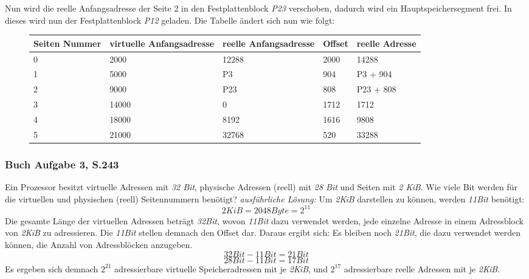 \documentclass[12pt,a4paper]{article}
\begin{document}
\newline
\newline
Nun wird die reelle Anfangsadresse der Seite 2 in den Festplattenblock \textit{P23} verschoben, dadurch wird ein Hauptspeichersegment frei. In dieses wird nun der Festplattenblock \textit{P12} geladen. Die Tabelle ändert sich nun wie folgt:
\begin{figure}[h]
	\begin{tabularx}{17cm}{| X | X | X | X | X |}
		\hline 
		\small{Seiten Nummer} & \small{virtuelle Anfangsadresse} & \small{reelle Anfangsadresse} & \small{Offset} & 			\small{reelle Adresse} \\
		\hline
		0 & 2000 & 12288 & 2000 & 14288 \\
		\hline
		1 & 5000 & P3 & 904 & P3 + 904 \\
		\hline
		2 & 9000 & P23 & 808 & P23 + 808 \\
		\hline
		3 & 14000 & 0 & 1712 & 1712 \\
		\hline
		4 & 18000 & 8192 & 1616 & 9808 \\
		\hline
		5 & 21000 & 32768 & 520 & 33288 \\
		\hline
	\end{tabularx}
\end{figure}

\subsubsection{Buch Aufgabe 3, S.243}
Ein Prozessor besitzt virtuelle Adressen mit \textit{32 Bit}, physische Adressen (reell) mit \textit{28 Bit} und Seiten mit \textit{2 KiB}.\newline
Wie viele Bit werden für die virtuellen und physischen (reell) Seitennummern benötigt?\newline \newline
\noindent \textit{ausführliche Lösung:} \newline
Um \textit{2KiB} darstellen zu können, werden \textit{11Bit} benötigt:
\begin{equation*}
	2KiB = 2048Byte = 2^{11}
\end{equation*}
Die gesamte Länge der virtuellen Adressen beträgt \textit{32Bit}, wovon \textit{11Bit} dazu verwendet werden, jede einzelne Adresse in einem Adressblock von \textit{2KiB} zu adressieren. Die \textit{11Bit} stellen demnach den Offset dar. Daraus ergibt sich:\newline
Es bleiben noch \textit{21Bit}, die dazu verwendet werden können, die Anzahl von Adressblöcken anzugeben.
\begin{equation*}
	32Bit - 11Bit = 21Bit
\end{equation*}
\begin{equation*}
	28Bit - 11Bit = 17Bit
\end{equation*}
Es ergeben sich demnach $2^{21}$ adressierbare virtuelle Speicheradressen mit je \textit{2KiB},\newline
und $2^{17}$ adressierbare reelle Adressen mit je \textit{2KiB}.
\end{document}
